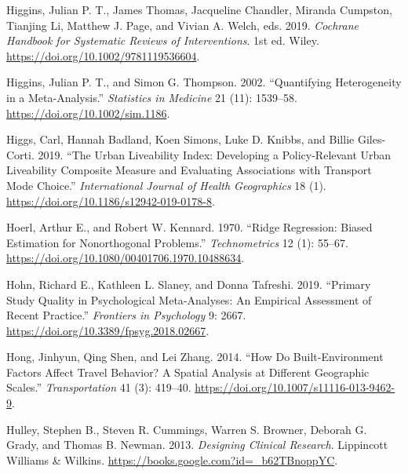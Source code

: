 \documentclass[
  11pt,
  openany]{memoir}
\newlength{\cslhangindent}
\newlength{\cslentryspacingunit} %
\newenvironment{CSLReferences}[2] %
 {%
  \setlength{\parindent}{0pt}
  \ifodd #1
  \let\oldpar\par
  \def\par{\hangindent=\cslhangindent\oldpar}
  \fi
  \setlength{\parskip}{#2\cslentryspacingunit}
 }%
 {}
\begin{document}
\begin{CSLReferences}{1}{0}
\leavevmode{}%
Higgins, Julian P. T., James Thomas, Jacqueline Chandler, Miranda Cumpston, Tianjing Li, Matthew J. Page, and Vivian A. Welch, eds. 2019. \emph{Cochrane {Handbook} for {Systematic Reviews} of {Interventions}}. 1st ed. {Wiley}. \url{https://doi.org/10.1002/9781119536604}.

\leavevmode{}%
Higgins, Julian P. T., and Simon G. Thompson. 2002. {``Quantifying Heterogeneity in a Meta-Analysis.''} \emph{Statistics in Medicine} 21 (11): 1539--58. \url{https://doi.org/10.1002/sim.1186}.

\leavevmode{}%
Higgs, Carl, Hannah Badland, Koen Simons, Luke D. Knibbs, and Billie Giles-Corti. 2019. {``The {Urban Liveability Index}: Developing a Policy-Relevant Urban Liveability Composite Measure and Evaluating Associations with Transport Mode Choice.''} \emph{International Journal of Health Geographics} 18 (1). \url{https://doi.org/10.1186/s12942-019-0178-8}.

\leavevmode{}%
Hoerl, Arthur E., and Robert W. Kennard. 1970. {``Ridge {Regression}: Biased {Estimation} for {Nonorthogonal Problems}.''} \emph{Technometrics} 12 (1): 55--67. \url{https://doi.org/10.1080/00401706.1970.10488634}.

\leavevmode{}%
Hohn, Richard E., Kathleen L. Slaney, and Donna Tafreshi. 2019. {``Primary {Study Quality} in {Psychological Meta}-{Analyses}: An {Empirical Assessment} of {Recent Practice}.''} \emph{Frontiers in Psychology} 9: 2667. \url{https://doi.org/10.3389/fpsyg.2018.02667}.

\leavevmode{}%
Hong, Jinhyun, Qing Shen, and Lei Zhang. 2014. {``How Do Built-Environment Factors Affect Travel Behavior? A Spatial Analysis at Different Geographic Scales.''} \emph{Transportation} 41 (3): 419--40. \url{https://doi.org/10.1007/s11116-013-9462-9}.

\leavevmode{}%
Hulley, Stephen B., Steven R. Cummings, Warren S. Browner, Deborah G. Grady, and Thomas B. Newman. 2013. \emph{Designing {Clinical Research}}. {Lippincott Williams \& Wilkins}. \url{https://books.google.com?id=_b62TBnoppYC}.


\end{CSLReferences}
\end{document}
